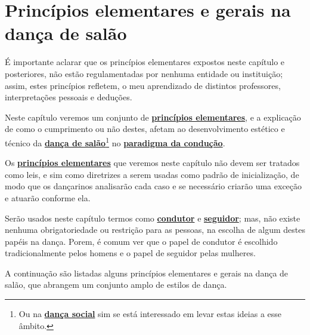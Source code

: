 \section{Princípios elementares e gerais na dança de salão}
\label{sec:PrincipioGeral}


\begin{tcbattention}
É importante aclarar
que os princípios elementares expostos neste capítulo e posteriores, 
não estão regulamentadas por nenhuma entidade ou instituição; assim, 
estes princípios refletem, o meu aprendizado de distintos professores,
interpretações pessoais  e deduções. 
\end{tcbattention}

Neste capítulo veremos um conjunto de \hyperref[def:Principio]{\textbf{princípios elementares}}, 
e a explicação de como o cumprimento ou não destes, 
afetam ao desenvolvimento estético e técnico da \hyperref[def:DancaSalao]{\textbf{dança de 
salão}}\footnote{Ou na \hyperref[def:DancaSocial]{\textbf{dança social}} sim se está interessado em levar estas ideias a esse âmbito.}  no \hyperref[def:ParadigmaConducao]{\textbf{paradigma da condução}}.

Os \hyperref[def:Principio]{\textbf{princípios elementares}} que veremos neste capítulo não devem ser
tratados como leis, e sim como diretrizes a serem usadas como padrão de inicialização, de modo que 
os dançarinos analisarão cada caso e se necessário criarão uma exceção e atuarão conforme ela.

Serão usados neste capítulo termos como \hyperref[def:Condutor]{\textbf{condutor}} e \hyperref[def:Seguidor]{\textbf{seguidor}}; 
mas, não existe nenhuma obrigatoriedade ou restrição para as pessoas, 
na escolha de algum destes papéis na dança.
Porem, é comum ver que o papel de condutor é escolhido tradicionalmente pelos homens e o papel de seguidor pelas mulheres.

A continuação são listadas alguns princípios elementares e gerais na dança de salão, 
que abrangem um conjunto amplo de estilos de dança.\\

